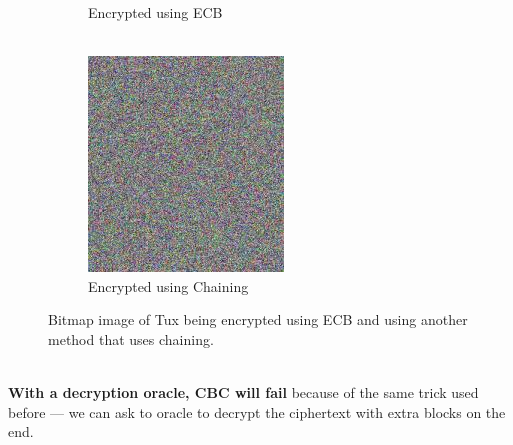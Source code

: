 \begin{figure}[htp!]
\begin{subfigure}[b]{0.3\textwidth}
            \caption{Encrypted using ECB\\~}
        \end{subfigure}
        \begin{subfigure}[b]{0.3\textwidth}
            \centering
            \includegraphics[width=\textwidth]{img/Tux_secure.jpg}
            \caption{Encrypted using Chaining}
        \end{subfigure}
        \caption{Bitmap image of Tux being encrypted using ECB and using another method that uses chaining.}
        \label{fig:tux}
    \end{figure}
    \\
    \textbf{With a decryption oracle, CBC will fail} because of the same trick used before --- we can ask to oracle to decrypt the ciphertext with extra blocks on the end.
    
    
    
